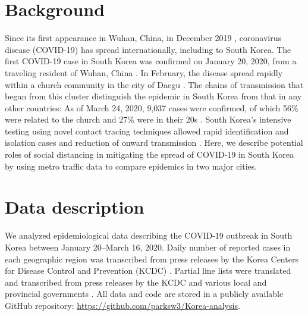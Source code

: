\documentclass[12pt]{article}
\date{\today}
\begin{document}


\pagebreak

\section{Background}

Since its first appearance in Wuhan, China, in December 2019 \citep{pneumonia}, coronavirus disease (COVID-19) has spread internationally, including to South Korea.
The first COVID-19 case in South Korea was confirmed on January 20, 2020, from a traveling resident of Wuhan, China \citep{kcdc}.
In February, the disease spread rapidly within a church community in the city of Daegu \citep{kcdc}.
The chains of transmission that began from this cluster distinguish the epidemic in South Korea from that in any other countries:
As of March 24, 2020, 9,037 cases were confirmed, of which 56\% were related to the church and 27\% were in their 20s \citep{kcdc}.
South Korea's intensive testing using novel contact tracing techniques allowed rapid identification and isolation cases and reduction of onward transmission \citep{fergusonimpact, tracingkorea, science}.
Here, we describe potential roles of social distancing in mitigating the spread of COVID-19 in South Korea by using metro traffic data to compare epidemics in two major cities.

\section{Data description}

We analyzed epidemiological data describing the COVID-19 outbreak in South Korea between January 20--March 16, 2020.
Daily number of reported cases in each geographic region was transcribed from press releases by the Korea Centers for Disease Control and Prevention (KCDC) \cite{kcdc}.
Partial line lists were translated and transcribed from press releases by the KCDC and various local and provincial governments \cite{seoul, busan, gwangju, ulsan, gyeonggi, daegu, gyeongnam}.
All data and code are stored in a publicly available GitHub repository: \url{https://github.com/parksw3/Korea-analysis}.
\end{document}
